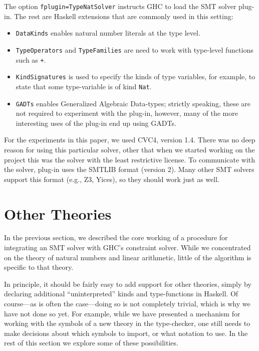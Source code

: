 \documentclass{sigplanconf}
\begin{document}
The option \Verb"fplugin=TypeNatSolver" instructs GHC to load the SMT solver
plug-in.  The rest are Haskell extensions that are commonly used in this
setting:

\break
\begin{itemize}
\item \Verb"DataKinds" enables natural number literals at the type
level.
\item \Verb"TypeOperators" and \Verb"TypeFamilies" are need to work
with type-level functions such as \Verb"+".
\item \Verb"KindSignatures" is used to specify the kinds of type variables,
for example, to state that some type-variable is of kind \Verb"Nat".
\item \Verb"GADTs" enables Generalized Algebraic Data-types;  strictly
speaking, these are not required to experiment with the plug-in, however,
many of the more interesting uses of the plug-in end up using GADTs.
\end{itemize}

For the experiments in this paper, we used CVC4, version 1.4.  There was
no deep reason for using this particular solver, other that when we started
working on the project this was the solver with the least restrictive license.
To communicate with the solver, plug-in uses the SMTLIB format (version 2).
Many other SMT solvers support this format (e.g., Z3, Yices), so they
should work just as well.



\section{Other Theories}
\label{other}

In the previous section, we described the core working of a procedure
for integrating an SMT solver with GHC's constraint solver.  While
we concentrated on the theory of natural numbers and linear arithmetic,
little of the algorithm is specific to that theory.

In principle, it should be fairly easy to add support for other theories,
simply by declaring additional ``uninterpreted'' kinds and type-functions
in Haskell.  Of course---as is often the case---doing so is not completely
trivial, which is why we have not done so yet.  For example, while we
have presented a mechanism for working with the symbols of a new theory
in the type-checker, one still needs to make decisions about which symbols
to import, or what notation to use.  In the rest of this section we
explore some of these possibilities.
\end{document}
